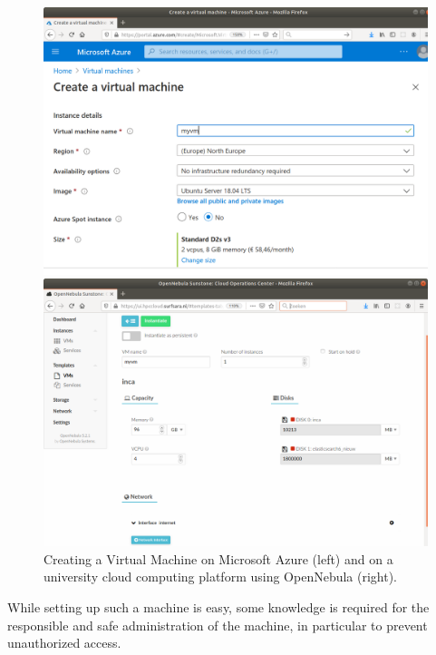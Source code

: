 \begin{figure}[!tbp]
  \centering
  \begin{minipage}[b]{0.45\textwidth}
    \includegraphics[width=\textwidth]{figures/vmazure.png}
  \end{minipage}
  \hfill
  \begin{minipage}[b]{0.45\textwidth}
    \includegraphics[width=\textwidth]{figures/vmopennebula.png}
  \end{minipage}
  \caption{\label{fig:createvm}Creating a Virtual Machine on Microsoft Azure (left) and on a university cloud computing platform using OpenNebula (right).}
\end{figure}

While setting up such a machine is easy, some knowledge is required
for the responsible and safe administration of the machine, in
particular to prevent unauthorized access.

